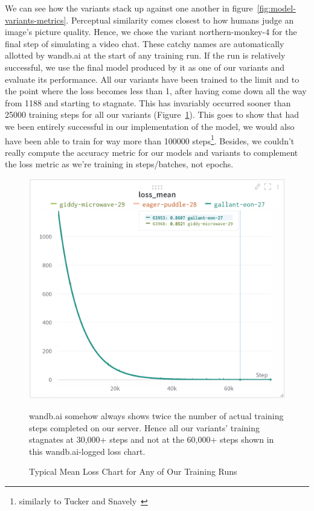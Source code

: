 We can see how the variants stack up against one another in figure~\ref{fig:model-variants-metrics}. Perceptual similarity comes closest to how humans judge an image's picture quality. Hence, we chose the variant northern-monkey-4 for the final step of simulating a video chat. These catchy names are automatically allotted by wandb.ai at the start of any training run. If the run is relatively successful, we use the final model produced by it as one of our variants and evaluate its performance. All our variants have been trained to the limit and to the point where the loss becomes less than 1, after having come down all the way from 1188 and starting to stagnate. This has invariably occurred sooner than 25000 training steps for all our variants (Figure~\ref{fig:mean-loss}). This goes to show that had we been entirely successful in our implementation of the model, we would also have been able to train for way more than 100000 steps\footnote{similarly to Tucker and Snavely~\cite{single_view_mpi}}. Besides, we couldn't really compute the accuracy metric for our models and variants to complement the loss metric as we're training in steps/batches, not epochs.

\begin{figure}[!h]
    \includegraphics[width=0.75\columnwidth]{figures/mean-loss.png}
    \caption{Typical Mean Loss Chart for Any of Our Training Runs}
    \label{fig:mean-loss}
    {\small wandb.ai somehow always shows twice the number of actual training steps completed on our server. Hence all our variants' training stagnates at 30,000+ steps and not at the 60,000+ steps shown in this wandb.ai-logged loss chart.}
\end{figure}

